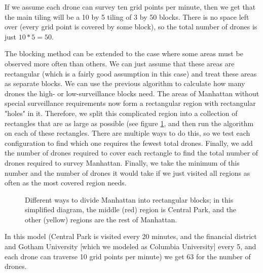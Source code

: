 \documentclass{article}
\begin{document}
If we assume each drone can survey ten grid points per minute, then we get that the main tiling will be a 10 by 5 tiling of 3 by 50 blocks. There is no space left over (every grid point is covered by some block), so the total number of drones is just $10*5 = 50$.

The blocking method can be extended to the case where some areas must be observed more often than others. We can just assume that these areas are rectangular (which is a fairly good assumption in this case) and treat these areas as separate blocks. We can use the previous algorithm to calculate how many drones the high- or low-surveillance blocks need. The areas of Manhattan without special surveillance requirements now form a rectangular region with rectangular "holes" in it. Therefore, we split this complicated region into a collection of rectangles that are as large as possible (see figure \ref{blocking2}, and then run the algorithm on each of these rectangles. There are multiple ways to do this, so we test each configuration to find which one requires the fewest total drones. Finally, we add the number of drones required to cover each rectangle to find the total number of drones required to survey Manhattan. Finally, we take the minimum of this number and the number of drones it would take if we just visited all regions as often as the most covered region needs.

\begin{figure}[htb!]
    \caption{Different ways to divide Manhattan into rectangular blocks; in this simplified diagram, the middle (red) region is Central Park, and the other (yellow) regions are the rest of Manhattan.}
    \label{blocking2}
\end{figure}

In this model (Central Park is visited every 20 minutes, and the financial district and Gotham University [which we modeled as Columbia University] every 5, and each drone can traverse 10 grid points per minute) we get 63 for the number of drones.
\end{document}
